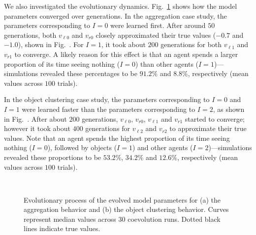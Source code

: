 We also investigated the evolutionary dynamics. Fig.~\ref{fig:model_parameters_convergence} shows how the model parameters converged over generations. In the aggregation case study, the parameters corresponding to $I=0$ were learned first. After around $50$ generations, both $v_{\ell0}$ and $v_{r0}$ closely approximated their true values ($-0.7$ and $-1.0$), shown in Fig.~. For $I=1$, it took about $200$ generations for both $v_{\ell1}$ and $v_{r1}$ to converge. A likely reason for this effect is that an agent spends a larger proportion of its time seeing nothing ($I=0$) than other agents ($I=1$)---simulations revealed these percentages to be $91.2\%$ and $8.8\%$, respectively (mean values across $100$ trials). 

In the object clustering case study, the parameters corresponding to $I=0$ and $I=1$ were learned faster than the parameters corresponding to $I=2$, as shown in Fig.~. After about $200$ generations, $v_{\ell0}$, $v_{r0}$, $v_{\ell1}$ and $v_{r1}$ started to converge; however it took about $400$ generations for $v_{\ell2}$ and $v_{r2}$ to approximate their true values. Note that an agent spends the highest proportion of its time seeing nothing ($I=0$), followed by objects ($I=1$) and other agents ($I=2$)---simulations revealed these proportions to be $53.2\%$, $34.2\%$ and $12.6\%$, respectively (mean values across $100$ trials).
\begin{figure}[!t]%
	\centering
		\\
		\caption{Evolutionary process of the evolved model parameters for (a) the aggregation behavior and (b) the object clustering behavior. Curves represent median values across 30 coevolution runs. Dotted black lines indicate true values. \label{fig:model_parameters_convergence}}
\end{figure}

